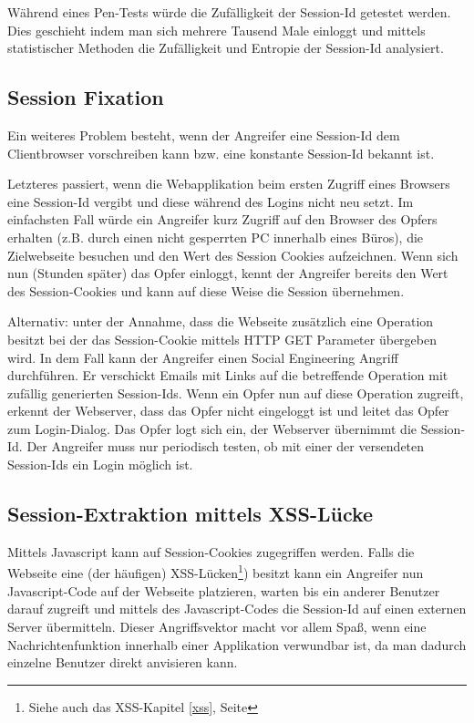 Während eines Pen-Tests würde die Zufälligkeit der Session-Id getestet werden. Dies geschieht indem man sich mehrere Tausend Male einloggt und mittels statistischer Methoden die Zufälligkeit und Entropie der Session-Id analysiert.

\subsection{Session Fixation}

Ein weiteres Problem besteht, wenn der Angreifer eine Session-Id dem Clientbrowser vorschreiben kann bzw. eine konstante Session-Id bekannt ist.

Letzteres passiert, wenn die Webapplikation beim ersten Zugriff eines Browsers eine Session-Id vergibt und diese während des Logins nicht neu setzt. Im einfachsten Fall würde ein Angreifer kurz Zugriff auf den Browser des Opfers erhalten (z.B. durch einen nicht gesperrten PC innerhalb eines Büros), die Zielwebseite besuchen und den Wert des Session Cookies aufzeichnen. Wenn sich nun (Stunden später) das Opfer einloggt, kennt der Angreifer bereits den Wert des Session-Cookies und kann auf diese Weise die Session übernehmen.

Alternativ: unter der Annahme, dass die Webseite zusätzlich eine Operation besitzt bei der das Session-Cookie mittels HTTP GET Parameter übergeben wird. In dem Fall kann der Angreifer einen Social Engineering Angriff durchführen. Er verschickt Emails mit Links auf die betreffende Operation mit zufällig generierten Session-Ids. Wenn ein Opfer nun auf diese Operation zugreift, erkennt der Webserver, dass das Opfer nicht eingeloggt ist und leitet das Opfer zum Login-Dialog. Das Opfer logt sich ein, der Webserver übernimmt die Session-Id. Der Angreifer muss nur periodisch testen, ob mit einer der versendeten Session-Ids ein Login möglich ist.

\subsection{Session-Extraktion mittels XSS-Lücke}

Mittels Javascript kann auf Session-Cookies zugegriffen werden. Falls die Webseite eine (der häufigen) XSS-Lücken\footnote{Siehe auch das XSS-Kapitel \ref{xss}, Seite \pageref{xss}}) besitzt kann ein Angreifer nun Javascript-Code auf der Webseite platzieren, warten bis ein anderer Benutzer darauf zugreift und mittels des Javascript-Codes die Session-Id auf einen externen Server übermitteln. Dieser Angriffsvektor macht vor allem Spaß, wenn eine Nachrichtenfunktion innerhalb einer Applikation verwundbar ist, da man dadurch einzelne Benutzer direkt anvisieren kann.

